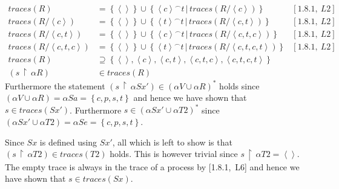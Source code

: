 \documentclass[11pt,a4paper]{article}
\def\ch{\,|\,}
\def\cat{^{\frown}}
\def\filter{\,\upharpoonright\,}
\newcommand{\ab}[1]{\left \langle #1 \right \rangle}
\newcommand{\sN}[1]{\left \lbrace #1 \right \rbrace}
\begin{document}
\begin{align*}
    traces(R) &= \sN{\ab{ }}
        \cup \sN{\ab{c} \cat t \ch traces(R/\ab{c})} & [1.8.1,~L2] \\
    traces(R/\ab{c}) &= \sN{\ab{ }}
        \cup \sN{\ab{t} \cat t \ch traces(R/\ab{c,t})} & [1.8.1,~L2] \\
    traces(R/\ab{c,t}) &= \sN{\ab{ }}
        \cup \sN{\ab{c} \cat t \ch traces(R/\ab{c,t,c})} & [1.8.1,~L2] \\
    traces(R/\ab{c,t,c}) &= \sN{\ab{ }}
        \cup \sN{\ab{t} \cat t \ch traces(R/\ab{c,t,c,t})} & [1.8.1,~L2] \\
    traces(R) &\supseteq \sN{\ab{ }, \ab{c}, \ab{c,t}, \ab{c,t,c}, \ab{c,t,c,t}}
    \\
    (s \filter \alpha R) &\in traces(R)
\end{align*}
Furthermore the statement $(s \filter \alpha Sx') \in (\alpha V \cup \alpha R)^*$ holds since $(\alpha
V \cup \alpha R) = \alpha Sa = \sN{c,p,s,t}$ and hence we have shown that
$s \in traces(Sx')$. Furthermore $s \in (\alpha Sx' \cup \alpha T2)^*$ since
$(\alpha Sx' \cup \alpha T2) = \alpha Se = \sN{c,p,s,t}$.

Since $Sx$ is defined using $Sx'$, all which is left to show is
that $(s \filter \alpha T2) \in traces(T2)$ holds. This is however trivial since
$s \filter \alpha T2 = \ab{}$. The empty trace is always in the trace of
a process by [1.8.1,~L6] and hence we have shown that $s \in traces(Sx)$.
\end{document}
